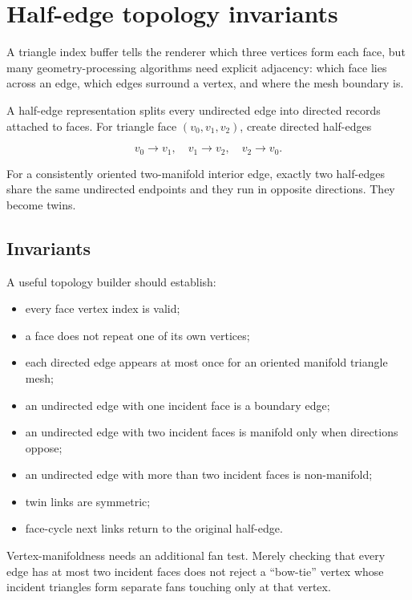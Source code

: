 \hypertarget{appendix-faac749c9cdd}{}
\section{Half-edge topology invariants}\label{appendix-faac749c9cdd-half-edge-topology-invariants}

A triangle index buffer tells the renderer which three vertices form each face, but many geometry-processing algorithms need explicit adjacency: which face lies across an edge, which edges surround a vertex, and where the mesh boundary is.

A half-edge representation splits every undirected edge into directed records attached to faces. For triangle face \((v_0,v_1,v_2)\), create directed half-edges

\[
v_0\rightarrow v_1,\quad
v_1\rightarrow v_2,\quad
v_2\rightarrow v_0.
\]

For a consistently oriented two-manifold interior edge, exactly two half-edges share the same undirected endpoints and they run in opposite directions. They become twins.

\subsection{Invariants}\label{appendix-faac749c9cdd-invariants}

A useful topology builder should establish:

\begin{itemize}
\tightlist
\item
  every face vertex index is valid;
\item
  a face does not repeat one of its own vertices;
\item
  each directed edge appears at most once for an oriented manifold triangle mesh;
\item
  an undirected edge with one incident face is a boundary edge;
\item
  an undirected edge with two incident faces is manifold only when directions oppose;
\item
  an undirected edge with more than two incident faces is non-manifold;
\item
  twin links are symmetric;
\item
  face-cycle next links return to the original half-edge.
\end{itemize}

Vertex-manifoldness needs an additional fan test. Merely checking that every edge has at most two incident faces does not reject a ``bow-tie'' vertex whose incident triangles form separate fans touching only at that vertex.


